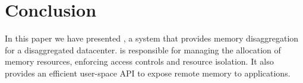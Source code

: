 \section{Conclusion}
\label{sec:conclusion}

In this paper we have presented \System, a system that provides memory disaggregation for a disaggregated datacenter. \System is responsible for managing the allocation of memory resources, enforcing access controls and resource isolation. It also provides an efficient user-space API to expose remote memory to applications.
